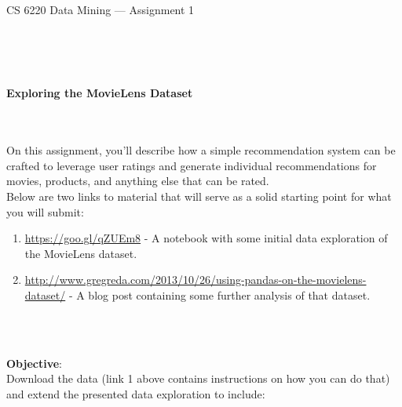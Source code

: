 \documentclass[letter-paper,12pt]{article} %
\begin{document}

\begin{center}
\begin{Huge}
CS 6220 Data Mining --- Assignment 1
\end{Huge}
\end{center}

\hline
\hline
~\\~\\~\\

\begin{center}
\begin{Large}
\textbf{Exploring the MovieLens Dataset}
\end{Large}
\end{center}
~\\~\\

On this assignment, you’ll describe how a simple recommendation system can be crafted to leverage user ratings and generate individual recommendations for movies, products, and anything else that can be rated.\\


Below are two links to material that will serve as a solid starting point for what you will submit: 
\begin{enumerate}
    \item \url{https://goo.gl/qZUEm8} - A notebook with some initial data exploration of the MovieLens dataset. 
    \item \url{http://www.gregreda.com/2013/10/26/using-pandas-on-the-movielens-dataset/} - A blog post containing some further analysis of that dataset. 
\end{enumerate}
~\\~

\textbf{Objective}:\\
Download the data (link 1 above contains instructions on how you can do that) and extend the presented data exploration to include:
\end{document}
